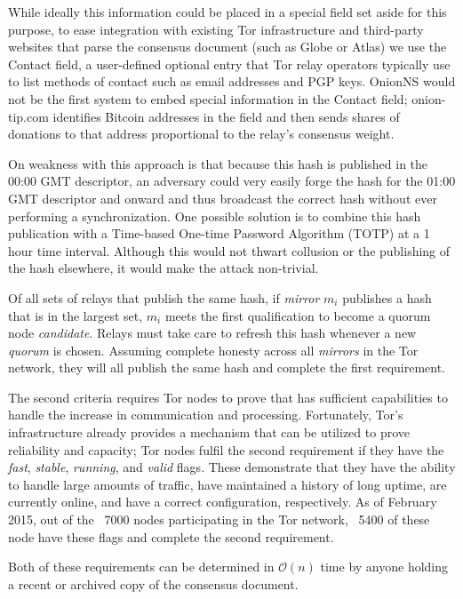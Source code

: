 While ideally this information could be placed in a special field set aside for this purpose, to ease integration with existing Tor infrastructure and third-party websites that parse the consensus document (such as Globe or Atlas) we use the Contact field, a user-defined optional entry that Tor relay operators typically use to list methods of contact such as email addresses and PGP keys. OnionNS would not be the first system to embed special information in the Contact field; onion-tip.com identifies Bitcoin addresses in the field and then sends shares of donations to that address proportional to the relay's consensus weight.

On weakness with this approach is that because this hash is published in the 00:00 GMT descriptor, an adversary could very easily forge the hash for the 01:00 GMT descriptor and onward and thus broadcast the correct hash without ever performing a synchronization. One possible solution is to combine this hash publication with a Time-based One-time Password Algorithm (TOTP) at a 1 hour time interval. Although this would not thwart collusion or the publishing of the hash elsewhere, it would make the attack non-trivial.

Of all sets of relays that publish the same hash, if \emph{mirror} $ m_{i} $ publishes a hash that is in the largest set, $ m_{i} $ meets the first qualification to become a quorum node \emph{candidate}. Relays must take care to refresh this hash whenever a new \emph{quorum} is chosen. Assuming complete honesty across all \emph{mirrors} in the Tor network, they will all publish the same hash and complete the first requirement.

The second criteria requires Tor nodes to prove that has sufficient capabilities to handle the increase in communication and processing. Fortunately, Tor's infrastructure already provides a mechanism that can be utilized to prove reliability and capacity; Tor nodes fulfil the second requirement if they have the \emph{fast}, \emph{stable}, \emph{running}, and \emph{valid} flags. These demonstrate that they have the ability to handle large amounts of traffic, have maintained a history of long uptime, are currently online, and have a correct configuration, respectively. As of February 2015, out of the ~7000 nodes participating in the Tor network, ~5400 of these node have these flags and complete the second requirement.

Both of these requirements can be determined in $ \mathcal{O}(n) $ time by anyone holding a recent or archived copy of the consensus document.

